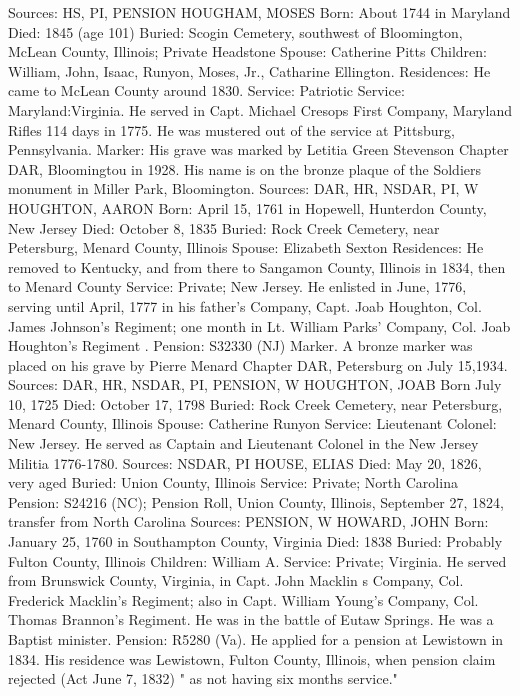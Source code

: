 Sources: HS, PI, PENSION 
HOUGHAM, MOSES 
Born: About 1744 in Maryland 
Died: 1845 (age 101) 
Buried: Scogin Cemetery, southwest of Bloomington, McLean County, Illinois; Private Headstone Spouse: Catherine Pitts 
Children: William, John, Isaac, Runyon, Moses, Jr., Catharine Ellington. 
Residences: He came to McLean County around 1830. 
Service: Patriotic Service: Maryland:Virginia. He served in Capt. Michael Cre­sops  First Company, Maryland Rifles 114 days in 1775. He was mustered out of the service at Pittsburg, Pennsylvania. 
Marker: His grave was marked by Letitia Green Stevenson Chapter DAR, Bloom­ingtou in 1928. His name is on the bronze plaque of the Soldiers monument in Miller Park, Bloomington. 
Sources: DAR, HR, NSDAR, PI, W 
HOUGHTON, AARON 
Born: April 15, 1761 in Hopewell, Hunterdon County, New Jersey 
Died: October 8, 1835
Buried: Rock Creek Cemetery, near Petersburg, Menard County, Illinois 
Spouse: Elizabeth Sexton 
Residences: He removed to Kentucky, and from there to Sangamon County, Illinois in 1834, then to Menard County  
Service: Private; New Jersey. He enlisted in June, 1776, serving until April, 1777 in his father's Company, Capt. Joab Houghton, Col. James Johnson's Regi­ment; one month in Lt. William Parks' Company, Col. Joab Houghton's Regiment . 
Pension: S32330 (NJ) 
Marker. A bronze marker was placed on his grave by Pierre Menard Chapter DAR, Petersburg on July 15,1934. 
Sources: DAR, HR, NSDAR, PI, PENSION, W 
HOUGHTON, JOAB 
Born  July 10, 1725 
Died: October 17, 1798 
Buried: Rock Creek Cemetery, near Petersburg, Menard County, Illinois 
Spouse: Catherine Runyon 
Service: Lieutenant Colonel: New Jersey. He served as Captain and Lieutenant Colonel in the New Jersey Militia 1776-1780. 
Sources: NSDAR, PI 
HOUSE, ELIAS 
Died: May 20, 1826, very aged 
Buried: Union County, Illinois 
Service: Private; North Carolina 
Pension: S24216 (NC); Pension Roll, Union County, Illinois, September 27, 1824, transfer from North Carolina
Sources: PENSION, W 
HOWARD, JOHN 
Born: January 25, 1760 in Southampton County, Virginia
Died: 1838 
Buried: Probably Fulton County, Illinois 
Children: William A. 
Service: Private; Virginia. He served from Brunswick County, Virginia, in Capt. John Macklin s Company, Col. Frederick Macklin's Regiment; also in Capt. William Young's Company, Col. Thomas Brannon's Regiment. He was in the battle of Eutaw Springs.  He was a Baptist minister. 
Pension: R5280 (Va). He applied for a pension at Lewistown in 1834. His resi­dence was Lewistown, Fulton County, Illinois, when pension claim rejected (Act June 7, 1832) " as not having six months service." 
